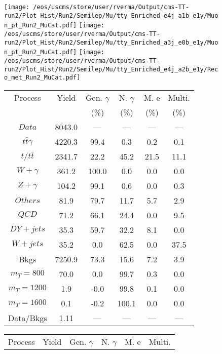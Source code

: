 \begin{figure}
\centering
\texttt{[image: /eos/uscms/store/user/rverma/Output/cms-TT-run2/Plot\_Hist/Run2/Semilep/Mu/tty\_Enriched\_e4j\_a1b\_e1y/Muon\_pt\_Run2\_MuCat.pdf]}
\texttt{[image: /eos/uscms/store/user/rverma/Output/cms-TT-run2/Plot\_Hist/Run2/Semilep/Mu/tty\_Enriched\_a3j\_e0b\_e1y/Muon\_pt\_Run2\_MuCat.pdf]}
\texttt{[image: /eos/uscms/store/user/rverma/Output/cms-TT-run2/Plot\_Hist/Run2/Semilep/Mu/tty\_Enriched\_e4j\_a2b\_e1y/Reco\_met\_Run2\_MuCat.pdf]}
\begin{minipage}[c]{0.32\textwidth}
\centering
\tiny{
\begin{tabular}{cccccc}
\hline
Process & Yield & Gen. $\gamma$ & N. $\gamma$ & M. e & Multi. \\
 &  & (\%) & (\%) & (\%) & (\%)  \\
\hline
                                                                      $ Data $ &  8043.0 &  --- &  --- &  --- &  ---\\
$ t\bar{t}\gamma $ &  4220.3 &  99.4 &  0.3 &  0.2 &  0.1\\
$ t/t\bar{t} $ &  2341.7 &  22.2 &  45.2 &  21.5 &  11.1\\
$ W+\gamma $ &  361.2 &  100.0 &  0.0 &  0.0 &  0.0\\
$ Z+\gamma $ &  104.2 &  99.1 &  0.6 &  0.0 &  0.3\\
$ Others $ &  81.9 &  79.7 &  11.7 &  5.7 &  2.9\\
$ QCD $ &  71.2 &  66.1 &  24.4 &  0.0 &  9.5\\
$ DY+jets $ &  35.3 &  59.7 &  32.2 &  8.1 &  0.0\\
$ W+jets $ &  35.2 &  0.0 &  62.5 &  0.0 &  37.5\\
Bkgs &  7250.9 &  73.3 &  15.6 &  7.2 &  3.9\\
$ m_{T} = 800 $ &  70.0 &  0.0 &  99.7 &  0.3 &  0.0\\
$ m_{T} = 1200 $ &  1.9 &  -0.0 &  99.8 &  0.1 &  0.0\\
$ m_{T} = 1600 $ &  0.1 &  -0.2 &  100.1 &  0.0 &  0.0\\
Data/Bkgs &  1.11 &  --- &  --- &  --- &  ---\\
\hline
\end{tabular}
}
\end{minipage}
\begin{minipage}[c]{0.32\textwidth}
\centering
\tiny{
\begin{tabular}{cccccc}
\hline
Process & Yield & Gen. $\gamma$ & N. $\gamma$ & M. e & Multi. \\

\end{tabular}}
\end{minipage}
\end{figure}

